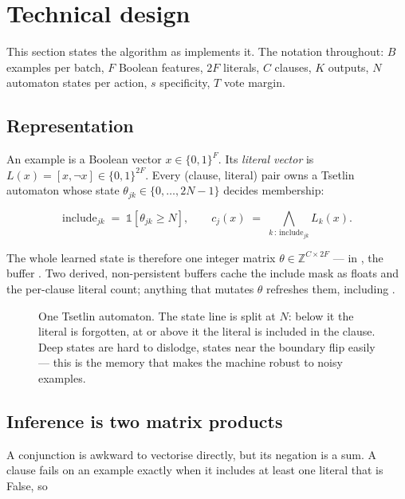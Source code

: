 \section{Technical design}
\label{sec:design}

This section states the algorithm as \ttlibname implements it. The notation throughout:
$B$ examples per batch, $F$ Boolean features, $2F$ literals, $C$ clauses, $K$ outputs,
$N$ automaton states per action, $s$ specificity, $T$ vote margin.

\subsection{Representation}

An example is a Boolean vector $x \in \{0,1\}^F$. Its \emph{literal vector} is
$L(x) = [x, \lnot x] \in \{0,1\}^{2F}$. Every (clause, literal) pair owns a Tsetlin automaton
whose state $\theta_{jk} \in \{0,\dots,2N-1\}$ decides membership:

\[
  \mathrm{include}_{jk} \;=\; \mathbb{1}\!\left[\theta_{jk} \ge N\right],
  \qquad
  c_j(x) \;=\; \bigwedge_{k \,:\, \mathrm{include}_{jk}} L_k(x).
\]

The whole learned state is therefore one integer matrix $\theta \in \mathbb{Z}^{C \times 2F}$
--- in \ttlibname, the  buffer . Two derived, non-persistent
buffers cache the include mask as floats and the per-clause literal count; anything that
mutates $\theta$ refreshes them, including .

\begin{figure}[htbp]
\centering
\resizebox{0.95\linewidth}{!}{}
\caption{One Tsetlin automaton. The state line is split at $N$: below it the literal is
  forgotten, at or above it the literal is included in the clause. Deep states are hard to
  dislodge, states near the boundary flip easily --- this is the memory that makes the
  machine robust to noisy examples.}
\label{fig:automaton}
\end{figure}

\subsection{Inference is two matrix products}
\label{sec:inference}

A conjunction is awkward to vectorise directly, but its negation is a sum. A clause fails on
an example exactly when it includes at least one literal that is False, so

